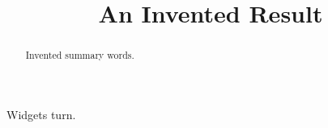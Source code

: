 \documentclass{inventedams}
\begin{document}
\title{An Invented Result}
\begin{abstract}Invented summary words.\end{abstract}
\maketitle
Widgets turn.
\end{document}
